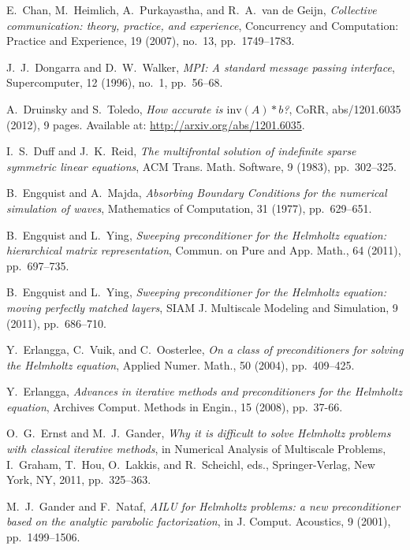 \begin{thebibliography}{10}
{\sc E.~Chan, M.~Heimlich, A.~Purkayastha, and R.~A.~van de Geijn},
{\em Collective communication: theory, practice, and experience},
Concurrency and Computation: Practice and Experience, 19 (2007), no.~13, 
pp.~1749--1783.

{\sc J.~J.~Dongarra and D.~W.~Walker},
{\em MPI: A standard message passing interface},
Supercomputer, 12 (1996), no.~1, pp.~56--68.

{\sc A.~Druinsky and S.~Toledo},
{\em How accurate is $\mathrm{inv}(A)*b$?},
CoRR, abs/1201.6035 (2012), 9 pages. Available at:
\url{http://arxiv.org/abs/1201.6035}.

{\sc I.~S.~Duff and J.~K.~Reid},
{\em The multifrontal solution of indefinite sparse symmetric linear equations},
ACM Trans. Math. Software, 9 (1983), pp.~302--325.

{\sc B.~Engquist and A.~Majda},
{\em Absorbing Boundary Conditions for the numerical simulation of waves},
Mathematics of Computation, 31 (1977), pp.~629--651.

{\sc B.~Engquist and L.~Ying}, 
{\em Sweeping preconditioner for the Helmholtz equation: hierarchical matrix 
 representation}, 
Commun. on Pure and App. Math., 64 (2011), pp.~697--735.

{\sc B.~Engquist and L.~Ying}, 
{\em Sweeping preconditioner for the Helmholtz equation: moving perfectly 
 matched layers},
SIAM J. Multiscale Modeling and Simulation, 9 (2011), pp.~686--710.

{\sc Y.~Erlangga, C.~Vuik, and C.~Oosterlee},
{\em On a class of preconditioners for solving the Helmholtz equation},
Applied Numer. Math., 50 (2004), pp.~409--425.

{\sc Y.~Erlangga},
{\em Advances in iterative methods and preconditioners for the Helmholtz 
 equation},
Archives Comput. Methods in Engin., 15 (2008), pp.~37-66.

{\sc O.~G.~Ernst and M.~J.~Gander},
{\em Why it is difficult to solve Helmholtz problems with classical iterative 
methods},
in Numerical Analysis of Multiscale Problems, I.~Graham, T.~Hou, O.~Lakkis, 
and R.~Scheichl, eds., Springer-Verlag, New York, NY, 2011, pp.~325--363.

{\sc M.~J.~Gander and F.~Nataf},
{\em AILU for Helmholtz problems: a new preconditioner based on the analytic 
parabolic factorization},
in J. Comput. Acoustics, 9 (2001), pp.~1499--1506.


\end{thebibliography}
